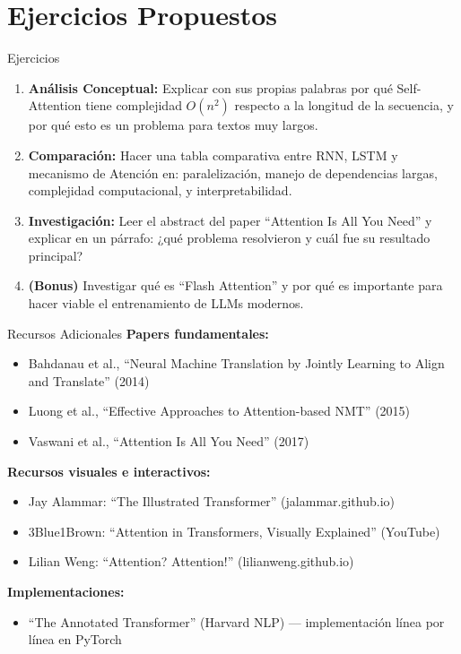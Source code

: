 \documentclass[aspectratio=169]{beamer}
\begin{document}
\section{Ejercicios Propuestos}

\begin{frame}{Ejercicios}
    \begin{enumerate}

        
        \item \textbf{Análisis Conceptual:} Explicar con sus propias palabras por qué Self-Attention tiene complejidad $O(n^2)$ respecto a la longitud de la secuencia, y por qué esto es un problema para textos muy largos.
        
        \item \textbf{Comparación:} Hacer una tabla comparativa entre RNN, LSTM y mecanismo de Atención en: paralelización, manejo de dependencias largas, complejidad computacional, y interpretabilidad.
        
        \item \textbf{Investigación:} Leer el abstract del paper ``Attention Is All You Need'' y explicar en un párrafo: ¿qué problema resolvieron y cuál fue su resultado principal?
        
        \item \textbf{(Bonus)} Investigar qué es ``Flash Attention'' y por qué es importante para hacer viable el entrenamiento de LLMs modernos.
    \end{enumerate}
\end{frame}

\begin{frame}{Recursos Adicionales}
    \textbf{Papers fundamentales:}
    \begin{itemize}
        \item Bahdanau et al., ``Neural Machine Translation by Jointly Learning to Align and Translate'' (2014)
        \item Luong et al., ``Effective Approaches to Attention-based NMT'' (2015)
        \item Vaswani et al., ``Attention Is All You Need'' (2017)
    \end{itemize}
    
    \vspace{0.3cm}
    \textbf{Recursos visuales e interactivos:}
    \begin{itemize}
        \item Jay Alammar: ``The Illustrated Transformer'' (jalammar.github.io)
        \item 3Blue1Brown: ``Attention in Transformers, Visually Explained'' (YouTube)
        \item Lilian Weng: ``Attention? Attention!'' (lilianweng.github.io)
    \end{itemize}
    
    \vspace{0.3cm}
    \textbf{Implementaciones:}
    \begin{itemize}
        \item ``The Annotated Transformer'' (Harvard NLP) --- implementación línea por línea en PyTorch
    \end{itemize}
\end{frame}
\end{document}
